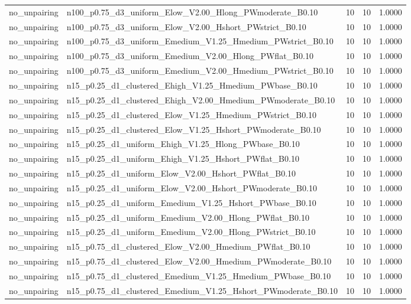 \begin{tabular}{llrrr}
no_unpairing & n100_p0.75_d3_uniform_Elow_V2.00_Hlong_PWmoderate_B0.10 & 10 & 10 & 1.0000 \\
no_unpairing & n100_p0.75_d3_uniform_Elow_V2.00_Hshort_PWstrict_B0.10 & 10 & 10 & 1.0000 \\
no_unpairing & n100_p0.75_d3_uniform_Emedium_V1.25_Hmedium_PWstrict_B0.10 & 10 & 10 & 1.0000 \\
no_unpairing & n100_p0.75_d3_uniform_Emedium_V2.00_Hlong_PWflat_B0.10 & 10 & 10 & 1.0000 \\
no_unpairing & n100_p0.75_d3_uniform_Emedium_V2.00_Hmedium_PWstrict_B0.10 & 10 & 10 & 1.0000 \\
no_unpairing & n15_p0.25_d1_clustered_Ehigh_V1.25_Hmedium_PWbase_B0.10 & 10 & 10 & 1.0000 \\
no_unpairing & n15_p0.25_d1_clustered_Ehigh_V2.00_Hmedium_PWmoderate_B0.10 & 10 & 10 & 1.0000 \\
no_unpairing & n15_p0.25_d1_clustered_Elow_V1.25_Hmedium_PWstrict_B0.10 & 10 & 10 & 1.0000 \\
no_unpairing & n15_p0.25_d1_clustered_Elow_V1.25_Hshort_PWmoderate_B0.10 & 10 & 10 & 1.0000 \\
no_unpairing & n15_p0.25_d1_uniform_Ehigh_V1.25_Hlong_PWbase_B0.10 & 10 & 10 & 1.0000 \\
no_unpairing & n15_p0.25_d1_uniform_Ehigh_V1.25_Hshort_PWflat_B0.10 & 10 & 10 & 1.0000 \\
no_unpairing & n15_p0.25_d1_uniform_Elow_V2.00_Hshort_PWflat_B0.10 & 10 & 10 & 1.0000 \\
no_unpairing & n15_p0.25_d1_uniform_Elow_V2.00_Hshort_PWmoderate_B0.10 & 10 & 10 & 1.0000 \\
no_unpairing & n15_p0.25_d1_uniform_Emedium_V1.25_Hshort_PWbase_B0.10 & 10 & 10 & 1.0000 \\
no_unpairing & n15_p0.25_d1_uniform_Emedium_V2.00_Hlong_PWflat_B0.10 & 10 & 10 & 1.0000 \\
no_unpairing & n15_p0.25_d1_uniform_Emedium_V2.00_Hlong_PWstrict_B0.10 & 10 & 10 & 1.0000 \\
no_unpairing & n15_p0.75_d1_clustered_Elow_V2.00_Hmedium_PWflat_B0.10 & 10 & 10 & 1.0000 \\
no_unpairing & n15_p0.75_d1_clustered_Elow_V2.00_Hmedium_PWmoderate_B0.10 & 10 & 10 & 1.0000 \\
no_unpairing & n15_p0.75_d1_clustered_Emedium_V1.25_Hmedium_PWbase_B0.10 & 10 & 10 & 1.0000 \\
no_unpairing & n15_p0.75_d1_clustered_Emedium_V1.25_Hshort_PWmoderate_B0.10 & 10 & 10 & 1.0000 \\

\end{tabular}
